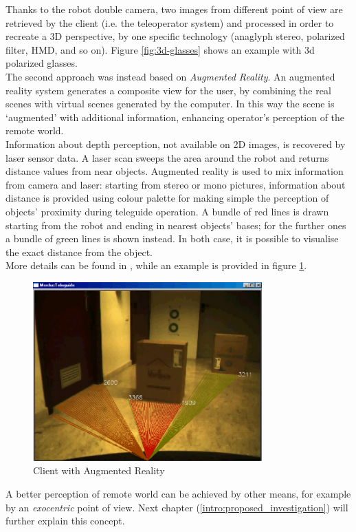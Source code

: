 Thanks to the robot double camera, two images from different point of
view are retrieved by the client (i.e. the teleoperator system) and
processed in order to recreate a 3D perspective, by one specific
technology (anaglyph stereo, polarized filter, HMD, and so on).
Figure \ref{fig:3d-glasses} shows an example with 3d polarized
glasses.
\\
The second approach was instead based on \textit{Augmented Reality}.
An augmented reality system generates a composite view for the user,
by combining the real scenes with virtual scenes generated by the
computer. In this way the scene is `augmented' with additional
information, enhancing operator's perception of the remote world.
\\
Information about depth perception, not available on
2D images, is recovered by laser sensor data. A laser scan sweeps the area
around the robot and returns distance values from near objects. Augmented
reality is used to mix information from camera and laser: starting from
stereo or mono pictures, information about distance is provided using colour
palette for making simple the perception of objects' proximity during
teleguide operation. A bundle of red lines is drawn starting from the robot
and ending in nearest objects' bases; for the further ones a bundle of green
lines is shown instead. In both case, it is possible to visualise the
exact distance from the object.
\\
More details can be found in \cite{morduc:macalusodetommaso}, while an
example is provided in figure \ref{fig:augmented_morduc}.

\begin{figure} [h]
  \begin{center}
    \includegraphics[width=250pt]{img/augmented_morduc.png}
    \caption{Client with Augmented Reality}
    \label{fig:augmented_morduc}
  \end{center}
\end{figure}

A better perception of remote world can be achieved by other means,
for example by an \textit{exocentric} point of view. Next chapter
(\ref{intro:proposed_investigation}) will further explain this concept.
